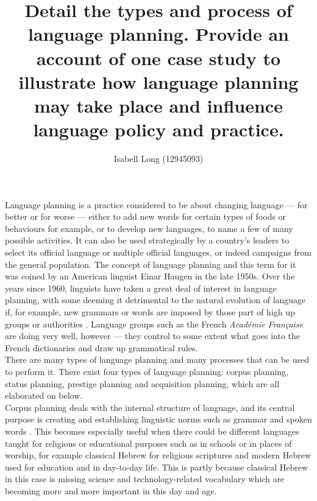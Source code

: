 \documentclass[12pt]{article}
\begin{document}
\title{\small{Detail the types and process of language planning.
              Provide an account of one case study to illustrate how
              language planning may take place and influence language
              policy and practice.}}
\author{Isabell Long (12945093)}
\maketitle

Language planning is a practice considered to be about changing
language --- for better or for worse --- either to add new words for
certain types of foods or behaviours for example, or to develop new
languages, to name a few of many possible activities. It can also be
used strategically by a country's leaders to select its official
language or multiple official languages, or indeed campaigns from the
general population. The concept of language planning and this term for
it was coined by an American linguist Einar Haugen in the late 1950s.
Over the years since 1960, linguists have taken a great deal of
interest in language planning, with some deeming it detrimental to the
natural evolution of language if, for example, new grammars or words
are imposed by those part of high up groups or authorities \citep[p.\
67]{language-planning-detrimental}. Language groups such as the French
\textit{Acad\'{e}mie Fran\c{c}aise} are doing very well, however ---
they control to some extent what goes into the French dictionaries and
draw up grammatical rules.\\

There are many types of language planning and many processes that can
be used to perform it. There exist four types of language planning:
corpus planning, status planning, prestige planning and acquisition
planning, which are all elaborated on below.\\

Corpus planning deals with the internal structure of language, and its
central purpose is creating and establishing linguistic norms such as
grammar and spoken words \citep[p.\ 372]{sociolinguistics-mesthrie}.
This becomes especially useful when there could be different languages
taught for religious or educational purposes such as in schools or in
places of worship, for example classical Hebrew for religious
scriptures and modern Hebrew used for education and in day-to-day
life. This is partly because classical Hebrew in this case is missing
science and technology-related vocabulary which are becoming more and
more important in this day and age.\\
\end{document}
